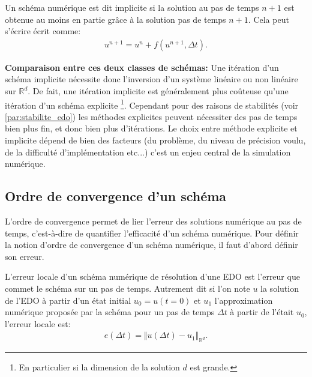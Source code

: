 \begin{definition}
    Un schéma numérique est dit implicite si la solution au pas  de temps $n+1$ est obtenue au moins en partie grâce à la solution pas de temps $n+1$. 
    Cela peut s'écrire écrit comme:
    \begin{align}
        u^{n+1} = u^n + f(u^{n+1} ,\Delta t ).
    \end{align}
    
\end{definition}

\textbf{Comparaison entre ces deux classes de schémas:}
Une itération d'un schéma implicite nécessite donc l'inversion d'un système linéaire ou non linéaire sur $\mathbb{R}^d$.
De fait, une itération implicite est généralement plus coûteuse qu'une itération d'un schéma explicite
\footnote{En particulier si la dimension de la solution $d$ est grande.}. 
Cependant pour des raisons de stabilités (voir \ref{par:stabilite_edo}) les méthodes explicites peuvent nécessiter des pas de temps bien plus fin, et donc bien plus d'itérations.
Le choix entre méthode explicite et implicite dépend de bien des facteurs (du problème, du niveau de précision voulu, de la difficulté d'implémentation etc...)
c'est un enjeu central de la simulation numérique.
\subsection{Ordre de convergence d'un schéma}
L'ordre de convergence permet de lier l'erreur des solutions numérique au pas de temps, c'est-à-dire de quantifier l'efficacité d'un schéma numérique.
Pour définir la notion d'ordre de convergence d'un schéma numérique, il faut d'abord définir son erreur.
\begin{definition}
    L'erreur locale d'un schéma numérique de résolution d'une EDO est l'erreur que commet le schéma sur un pas de temps.
    Autrement dit si l'on note $u$ la solution de l'EDO à partir d'un état initial $u_0 = u(t=0)$ et $u_1$ l'approximation numérique proposée par la schéma 
    pour un pas de temps $\Delta t$ à partir de l'était $u_0$, l'erreur locale est: 
    \begin{align}
        e(\Delta t) = \Vert u(\Delta t) - u_1 \Vert_{\mathbb{R}^d}.
    \end{align}
\end{definition}

